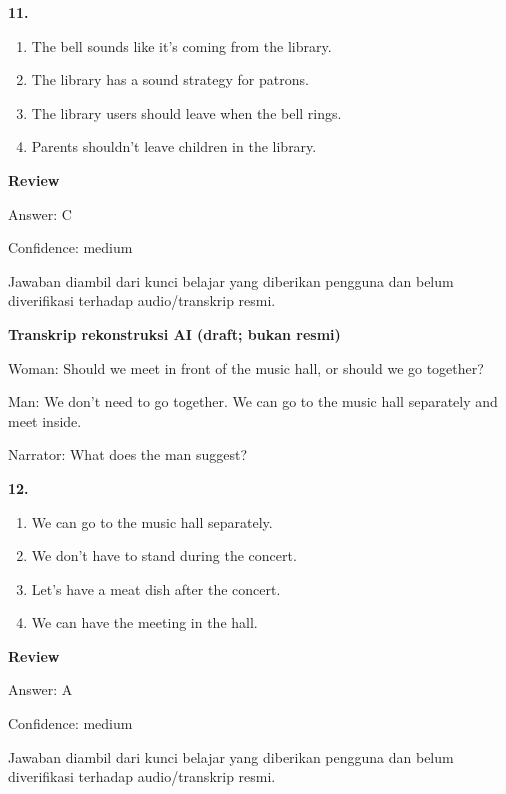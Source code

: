 \documentclass[12pt]{article}
\begin{document}
\noindent\textbf{11.}
\begin{enumerate}[label=(\Alph*),leftmargin=*,itemsep=0.2em]
\item The bell sounds like it's coming from the library.
\item The library has a sound strategy for patrons.
\item The library users should leave when the bell rings.
\item Parents shouldn't leave children in the library.
\end{enumerate}
\par
\begingroup
\setlength{\parskip}{0pt}
\setlength{\parindent}{0pt}
\textbf{Review}\par
Answer: C\par
Confidence: medium\par
Jawaban diambil dari kunci belajar yang diberikan pengguna dan belum diverifikasi terhadap audio/transkrip resmi.\par
\endgroup
\par
\vspace{0.25\baselineskip}
\begin{exampleblock}
\textbf{Transkrip rekonstruksi AI (draft; bukan resmi)}\par
Woman: Should we meet in front of the music hall, or should we go together?\par
Man: We don't need to go together. We can go to the music hall separately and meet inside.\par
Narrator: What does the man suggest?\par
\end{exampleblock}
\noindent\textbf{12.}
\begin{enumerate}[label=(\Alph*),leftmargin=*,itemsep=0.2em]
\item We can go to the music hall separately.
\item We don't have to stand during the concert.
\item Let's have a meat dish after the concert.
\item We can have the meeting in the hall.
\end{enumerate}
\par
\begingroup
\setlength{\parskip}{0pt}
\setlength{\parindent}{0pt}
\textbf{Review}\par
Answer: A\par
Confidence: medium\par
Jawaban diambil dari kunci belajar yang diberikan pengguna dan belum diverifikasi terhadap audio/transkrip resmi.\par
\end{document}
